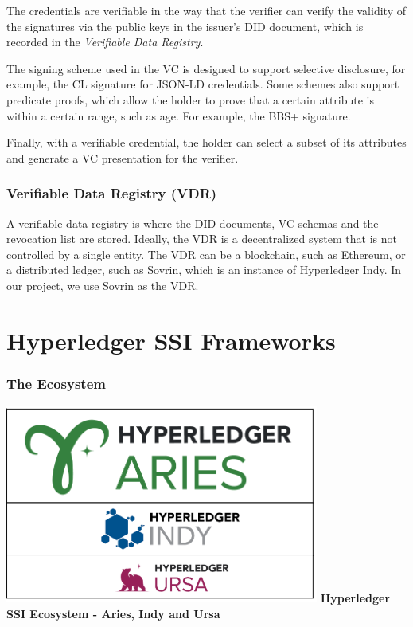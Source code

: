 \documentclass[
]{report}
\begin{document}
The credentials are verifiable in the way that the verifier can verify the
validity of the signatures via the public keys in the issuer's DID document,
which is recorded in the \emph{Verifiable Data Registry}.

The signing scheme used in the VC is designed to support selective disclosure,
for example, the CL signature for JSON-LD credentials. Some schemes also 
support predicate proofs, which allow the holder to prove that a certain
attribute is within a certain range, such as age. For example, the BBS+ 
signature.

Finally, with a verifiable credential, the holder can select a subset of its
attributes and generate a VC presentation for the verifier.

\subsubsection{Verifiable Data Registry (VDR)}
A verifiable data registry is where the DID documents, VC schemas and the
revocation list are stored. Ideally, the VDR is a decentralized system that
is not controlled by a single entity. The VDR can be a blockchain, such as
Ethereum, or a distributed ledger, such as Sovrin, which is an instance of
Hyperledger Indy. In our project, we use Sovrin as the VDR.

\section{Hyperledger SSI Frameworks}

\subsubsection{The Ecosystem}

\includegraphics{eco.png} \textbf{Hyperledger SSI Ecosystem - Aries,
Indy and Ursa}
\end{document}
